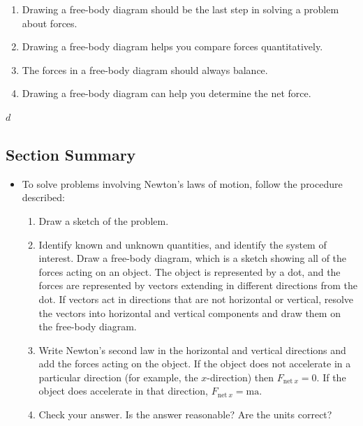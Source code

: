 \documentclass[
]{book}
\providecommand{\tightlist}{%
  \setlength{\itemsep}{0pt}\setlength{\parskip}{0pt}}
\newenvironment{ap-test-prep}{}{}
\begin{document}
\begin{ap-test-prep}
\begin{enumerate}
\def\labelenumi{\alph{enumi}.}
\tightlist
\item
  Drawing a free-body diagram should be the last step in solving a
  problem about forces.
\item
  Drawing a free-body diagram helps you compare forces quantitatively.
\item
  The forces in a free-body diagram should always balance.
\item
  Drawing a free-body diagram can help you determine the net force.
\end{enumerate}

\leavevmode\hypertarget{fs-id1095594}{}%
\(d\)

\end{ap-test-prep}

\hypertarget{fs-id1452262-summary}{}
\hypertarget{section-summary-13}{%
\subsection{Section Summary}\label{section-summary-13}}

\begin{itemize}
\tightlist
\item
  \protect\hypertarget{import-auto-id1655645}{}{To solve problems involving Newton's laws of motion, follow the
  procedure described:}

  \begin{enumerate}
  \def\labelenumi{\arabic{enumi}.}
  \tightlist
  \item
    \protect\hypertarget{import-auto-id1435944}{}{Draw a sketch of the problem.}
  \item
    \protect\hypertarget{import-auto-id1304011}{}{Identify known and unknown quantities, and identify the system
    of interest. Draw a free-body diagram, which is a sketch showing
    all of the forces acting on an object. The object is represented
    by a dot, and the forces are represented by vectors extending in
    different directions from the dot. If vectors act in directions
    that are not horizontal or vertical, resolve the vectors into
    horizontal and vertical components and draw them on the
    free-body diagram.}
  \item
    \protect\hypertarget{import-auto-id2638784}{}{Write Newton's second law in the horizontal and vertical
    directions and add the forces acting on the object. If the
    object does not accelerate in a particular direction (for
    example, the \(x{}\)-direction) then \({F_{\text{net}\ x} = 0}{}\).
    If the object does accelerate in that direction,
    \({F_{\text{net}\ x} = \text{ma}}{}\).}
  \item
    \protect\hypertarget{import-auto-id2664631}{}{Check your answer. Is the answer reasonable? Are the units
    correct?}
  \end{enumerate}
\end{itemize}
\end{document}
